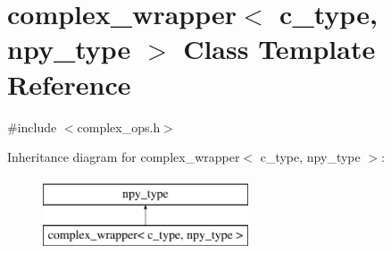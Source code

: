 \hypertarget{classcomplex__wrapper}{}\section{complex\+\_\+wrapper$<$ c\+\_\+type, npy\+\_\+type $>$ Class Template Reference}
\label{classcomplex__wrapper}


{\ttfamily \#include $<$complex\+\_\+ops.\+h$>$}

Inheritance diagram for complex\+\_\+wrapper$<$ c\+\_\+type, npy\+\_\+type $>$\+:\begin{figure}[H]
\begin{center}
\leavevmode
\includegraphics[height=2.000000cm]{classcomplex__wrapper}
\end{center}
\end{figure}
